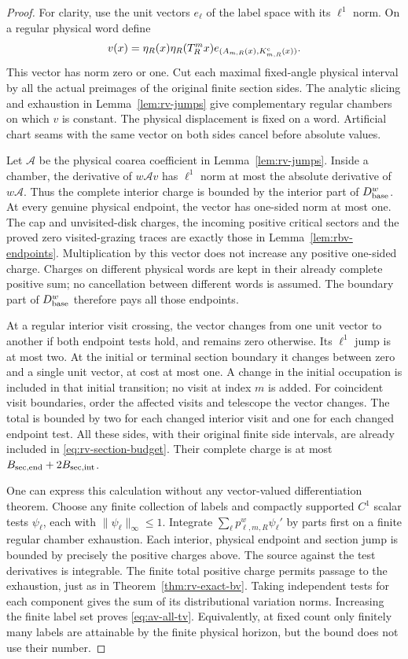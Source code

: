 \begin{proof}
For clarity, use the unit vectors $e_\ell$ of the label space with its
$\ell^1$ norm.  On a regular physical word define
\[
 v(x)=\eta_R(x)\eta_R(T_R^mx)
              e_{(A_{m,R}(x),K^{\rm c}_{m,R}(x))}.
\]
This vector has norm zero or one.  Cut each maximal fixed-angle
physical interval by all the actual preimages of the original finite
section sides.  The analytic slicing and exhaustion in
Lemma~\ref{lem:rv-jumps} give complementary regular chambers on
which $v$ is constant.  The physical displacement is fixed on a
word.  Artificial chart seams with the same vector on both sides
cancel before absolute values.

Let $\mathscr A$ be the physical coarea coefficient in
Lemma~\ref{lem:rv-jumps}.  Inside a chamber, the derivative of
$w\mathscr A v$ has $\ell^1$ norm at most the absolute derivative
of $w\mathscr A$.  Thus the complete interior charge is bounded by
the interior part of $D_{\rm base}^w$.  At every genuine physical
endpoint, the vector has one-sided norm at most one.  The cap and
unvisited-disk charges, the incoming positive critical sectors and
the proved zero visited-grazing traces are exactly those in
Lemma~\ref{lem:rbv-endpoints}.  Multiplication by this vector does
not increase any positive one-sided charge.  Charges on different
physical words are kept in their already complete positive sum;
no cancellation between different words is assumed.  The boundary
part of $D_{\rm base}^w$ therefore pays all those endpoints.

At a regular interior visit crossing, the vector changes from one
unit vector to another if both endpoint tests hold, and remains zero
otherwise.  Its $\ell^1$ jump is at most two.  At the initial or
terminal section boundary it changes between zero and a single unit
vector, at cost at most one.  A change in the initial occupation is
included in that initial transition; no visit at index $m$ is added.
For coincident visit boundaries, order the affected visits and
telescope the vector changes.  The total is bounded by two for each
changed interior visit and one for each changed endpoint test.
All these sides, with their original finite side intervals, are
already included in \eqref{eq:rv-section-budget}.  Their complete
charge is at most $B_{\rm sec,end}+2B_{\rm sec,int}$.

One can express this calculation without any vector-valued
differentiation theorem.  Choose any finite collection of labels
and compactly supported $C^1$ scalar tests $\psi_\ell$, each with
$\|\psi_\ell\|_\infty\le1$.  Integrate
$\sum_\ell p^w_{\ell,m,R}\psi_\ell'$ by parts first on a finite
regular chamber exhaustion.  Each interior, physical endpoint and
section jump is bounded by precisely the positive charges above.
The source against the test derivatives is integrable.  The finite
total positive charge permits passage to the exhaustion, just as
in Theorem~\ref{thm:rv-exact-bv}.  Taking independent tests for each
component gives the sum of its distributional variation norms.
Increasing the finite label set proves \eqref{eq:av-all-tv}.
Equivalently, at fixed count only finitely many labels are attainable
by the finite physical horizon, but the bound does not use their
number.


\end{proof}
